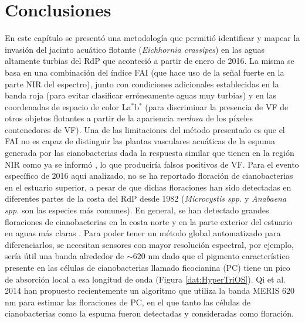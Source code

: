 \section{Conclusiones}
\label{cam:s:conclusiones}
    En este capítulo se presentó una metodología que permitió identificar y mapear la invasión del jacinto acuático flotante (\textit{Eichhornia crassipes}) en las aguas altamente turbias del RdP que aconteció a partir de enero de 2016. La misma se basa en una combinación del índice FAI (que hace uso de la señal fuerte en la parte NIR del espectro), junto con condiciones adicionales establecidas en la banda roja (para evitar clasificar erróneamente aguas muy turbias) y en las coordenadas de espacio de color La$^{*}$b$^{*}$ (para discriminar la presencia de VF de otros objetos flotantes a partir de la apariencia \textit{verdosa} de los píxeles contenedores de VF). Una de las limitaciones del método presentado es que el FAI no es capaz de distinguir las plantas vasculares acuáticas de la espuma generada por las cianobacterias dada la respuesta similar que tienen en la región NIR como ya se informó \cite{hu2010b} \cite{oyama2015}, lo que produciría falsos positivos de VF. Para el evento específico de 2016 aquí analizado, no se ha reportado floración de cianobacterias en el estuario superior, a pesar de que dichas floraciones  han sido detectadas en diferentes partes de la costa del RdP desde 1982 (\textit{Microcystis spp.} y \textit{Anabaena spp.} son las especies más comunes). En general, se han detectado grandes floraciones de cianobacterias en la costa norte y en la parte exterior del estuario en aguas más claras \cite{dogliotti2016b}. Para poder tener un método global automatizado para diferenciarlos, se necesitan sensores con mayor resolución espectral, por ejemplo, sería útil una banda alrededor de $\sim 620$ nm dado que el pigmento característico presente en las células de cianobacterias llamado ficocianina (PC) tiene un pico de absorción local a esa longitud de onda (Figura \ref{dat:HyperTriOS}). Qi et al. 2014 \cite{qi2014}  han propuesto recientemente un algoritmo que utiliza la banda MERIS 620 nm para estimar las floraciones de PC, en el que tanto las células de cianobacterias como la espuma fueron detectadas y consideradas como floración.
